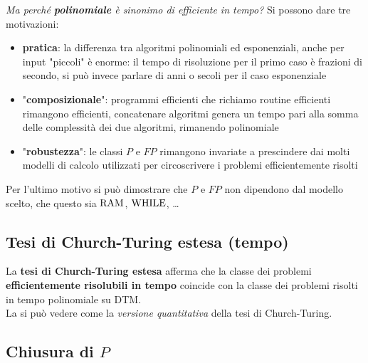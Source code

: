 \textit{Ma perché \textbf{polinomiale} è sinonimo di efficiente in tempo?} Si possono dare tre motivazioni: 
\begin{itemize}
	\item \textbf{pratica}: la differenza tra algoritmi polinomiali ed esponenziali, anche per input "piccoli" è enorme: il tempo di risoluzione per il primo caso è frazioni di secondo, si può invece parlare di anni o secoli per il caso esponenziale
	\item "\textbf{composizionale}": programmi efficienti che richiamo routine efficienti rimangono efficienti, concatenare algoritmi genera un tempo pari alla somma delle complessità dei due algoritmi, rimanendo polinomiale
	\item "\textbf{robustezza}": le classi $P$ e $FP$ rimangono invariate a prescindere dai molti modelli di calcolo utilizzati per circoscrivere i problemi efficientemente risolti
\end{itemize}

Per l'ultimo motivo si può dimostrare che $P$ e $FP$ non dipendono dal modello scelto, che questo sia $\text{RAM}$, $\text{WHILE}$, \dots

\subsection{Tesi di Church-Turing estesa (tempo)}

La \textbf{tesi di Church-Turing estesa} afferma che la classe dei problemi \textbf{efficientemente risolubili in tempo} coincide con la classe dei problemi risolti in tempo polinomiale su DTM.\\

La si può vedere come la \textit{versione quantitativa} della tesi di Church-Turing.\\

\subsection{Chiusura di $P$}

